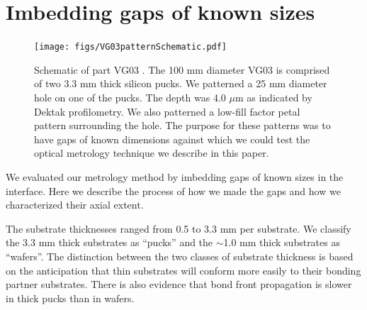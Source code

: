 \documentclass[osajnl,preprint,showpacs,superscriptaddress,12pt]{revtex4-1} %
\begin{document}
\section{Imbedding gaps of known sizes}

\begin{figure}[htbp]
\centerline{\texttt{[image: figs/VG03patternSchematic.pdf]}}
\caption{Schematic of part VG03 \label{figVG03pattern}.  The 100 mm diameter VG03 is comprised of two 3.3 mm thick silicon pucks.  We patterned a 25 mm diameter hole on one of the pucks.  The depth was 4.0 $\mu$m as indicated by Dektak profilometry.  We also patterned a low-fill factor petal pattern surrounding the hole.  The purpose for these patterns was to have gaps of known dimensions against which we could test the optical metrology technique we describe in this paper.}
\end{figure}

We evaluated our metrology method by imbedding gaps of known sizes in the interface.  Here we describe the process of how we made the gaps and how we characterized their axial extent.  

The substrate thicknesses ranged from 0.5 to 3.3 mm per substrate.  We classify the 3.3 mm thick substrates as ``pucks'' and the $\sim$1.0 mm thick substrates as ``wafers''.  The distinction between the two classes of substrate thickness is based on the anticipation that thin substrates will conform more easily to their bonding partner substrates.  There is also evidence that bond front propagation is slower in thick pucks \cite{2007ApOpt..46.6793H} than in wafers.  
\end{document}
